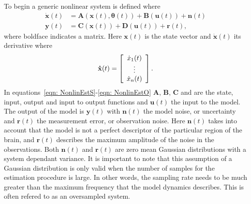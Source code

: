 To begin a generic nonlinear system is defined where \begin{align}
\label{eqn: NonlinEstS}
\mathbf{\dot{x}}(t) &= \mathbf{A}(\mathbf{x}(t),\mathbf{\theta}(t)) + \mathbf{B}(\mathbf{u}(t)) + \mathbf{n}(t)\\
\label{eqn: NonLinEstO}
\mathbf{y}(t)  &= \mathbf{C}(\mathbf{x}(t)) +\mathbf{D}(\mathbf{u}(t))+\mathbf{r}(t),
\end{align} where boldface indicates a matrix. Here $\mathbf{x}(t)$ is the state vector and $\dot{\mathbf{x}}(t)$ its derivative where
\[ \mathbf{\dot{x}}(t) = \left[ \begin{array}[pos]{c}
\dot{x}_{1}(t)\\
\vdots \\
\dot{x}_{n}(t) \end{array} \right] .\]  In equations~\ref{eqn: NonlinEstS}-\ref{eqn: NonlinEstO} $\mathbf{A}$, $\mathbf{B}$, $\mathbf{C}$ and  are the state, input, output and input to output functions and $\mathbf{u}(t)$ the input to the model. The output of the model is $\mathbf{y}(t)$ with $\mathbf{n}(t)$ the model noise, or uncertainty and $\mathbf{r}(t)$ the measurement error, or observation noise. Here $\mathbf{n}(t)$ takes into account that the model is not a perfect descriptor of the particular region of the brain, and $\mathbf{r}(t)$ describes the maximum amplitude of the noise in the observations. Both $\mathbf{n}(t)$ and $\mathbf{r}(t)$ are zero mean Gaussian distributions with a system dependant variance. It is important to note that this assumption of a Gaussian distribution is only valid when the number of samples for the estimation procedure is large. In other words, the sampling rate needs to be much greater than the maximum frequency that the model dynamics describes. This is often refered to as an oversampled system.

